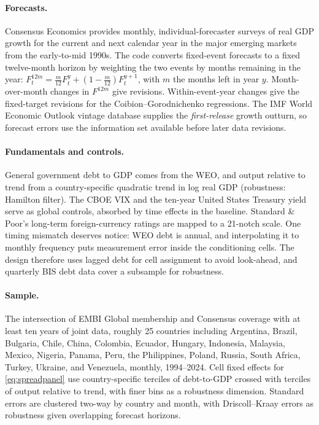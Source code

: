 \documentclass[11pt]{article}
\theoremstyle{definition}
\begin{document}
\paragraph{Forecasts.} Consensus Economics provides monthly, individual-forecaster surveys of real GDP growth for the current and next calendar year in the major emerging markets from the early-to-mid 1990s. The code converts fixed-event forecasts to a fixed twelve-month horizon by weighting the two events by months remaining in the year: $F^{12m}_t = \tfrac{m}{12} F^{y}_t + (1 - \tfrac{m}{12}) F^{y+1}_t$, with $m$ the months left in year $y$. Month-over-month changes in $F^{12m}$ give revisions. Within-event-year changes give the fixed-target revisions for the Coibion--Gorodnichenko regressions. The IMF World Economic Outlook vintage database supplies the \emph{first-release} growth outturn, so forecast errors use the information set available before later data revisions.

\paragraph{Fundamentals and controls.} General government debt to GDP comes from the WEO, and output relative to trend from a country-specific quadratic trend in log real GDP (robustness: Hamilton filter). The CBOE VIX and the ten-year United States Treasury yield serve as global controls, absorbed by time effects in the baseline. Standard \& Poor's long-term foreign-currency ratings are mapped to a 21-notch scale. One timing mismatch deserves notice: WEO debt is annual, and interpolating it to monthly frequency puts measurement error inside the conditioning cells. The design therefore uses lagged debt for cell assignment to avoid look-ahead, and quarterly BIS debt data cover a subsample for robustness.

\paragraph{Sample.} The intersection of EMBI Global membership and Consensus coverage with at least ten years of joint data, roughly 25 countries including Argentina, Brazil, Bulgaria, Chile, China, Colombia, Ecuador, Hungary, Indonesia, Malaysia, Mexico, Nigeria, Panama, Peru, the Philippines, Poland, Russia, South Africa, Turkey, Ukraine, and Venezuela, monthly, 1994--2024. Cell fixed effects for \eqref{eq:spreadpanel} use country-specific terciles of debt-to-GDP crossed with terciles of output relative to trend, with finer bins as a robustness dimension. Standard errors are clustered two-way by country and month, with Driscoll--Kraay errors as robustness given overlapping forecast horizons.
\end{document}
